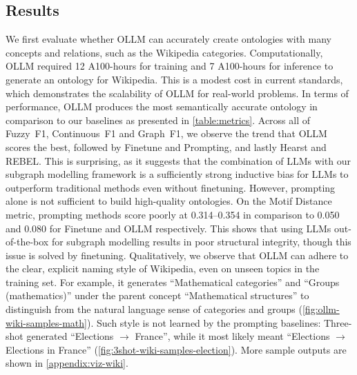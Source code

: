 \documentclass{article}
\newcommand{\name}{{OLLM}\xspace}
\begin{document}
\subsection{Results}  \label{sec:results}

%
We first evaluate whether \name can accurately create ontologies with many concepts and relations, such as the Wikipedia categories. Computationally, \name required 12 A100-hours for training and 7 A100-hours for inference to generate an ontology for Wikipedia. This is a modest cost in current standards, which demonstrates the scalability of \name for real-world problems. 
In terms of performance, \name produces the most semantically accurate ontology in comparison to our baselines as presented in \cref{table:metrics}. Across all of Fuzzy~F1, Continuous~F1 and Graph~F1, we observe the trend that \name scores the best, followed by Finetune and Prompting, and lastly Hearst and REBEL. This is surprising, as it suggests that the combination of LLMs with our subgraph modelling framework is a sufficiently strong inductive bias for LLMs to outperform traditional methods even without finetuning. However, prompting alone is not sufficient to build high-quality ontologies. 
On the Motif Distance metric, prompting methods score poorly at 0.314--0.354 in comparison to 0.050 and 0.080 for Finetune and \name respectively. This shows that using LLMs out-of-the-box for subgraph modelling results in poor structural integrity, though this issue is solved by finetuning. 
Qualitatively, we observe that \name can adhere to the clear, explicit naming style of Wikipedia, even on unseen topics in the training set. For example, it generates ``Mathematical categories'' and ``Groups (mathematics)'' under the parent concept ``Mathematical structures'' to distinguish from the natural language sense of categories and groups (\cref{fig:ollm-wiki-samples-math}). Such style is not learned by the prompting baselines: Three-shot generated ``Elections $\to$ France'', while it most likely meant ``Elections $\to$ Elections in France'' (\cref{fig:3shot-wiki-samples-election}). More sample outputs are shown in \cref{appendix:viz-wiki}.

\end{document}
